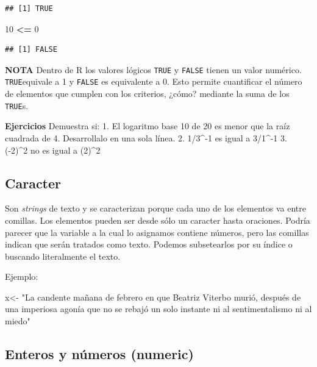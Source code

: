 \documentclass[
]{book}
\newenvironment{Shaded}{\begin{snugshade}}{\end{snugshade}}
\newcommand{\DecValTok}[1]{\textcolor[rgb]{0.00,0.00,0.81}{#1}}
\newcommand{\NormalTok}[1]{#1}
\newcommand{\OtherTok}[1]{\textcolor[rgb]{0.56,0.35,0.01}{#1}}
\newcommand{\SpecialCharTok}[1]{\textcolor[rgb]{0.81,0.36,0.00}{\textbf{#1}}}
\newcommand{\StringTok}[1]{\textcolor[rgb]{0.31,0.60,0.02}{#1}}
\begin{document}
\begin{verbatim}
## [1] TRUE
\end{verbatim}

\begin{Shaded}
\begin{Highlighting}[]
\DecValTok{10} \SpecialCharTok{\textless{}=} \DecValTok{0}   
\end{Highlighting}
\end{Shaded}

\begin{verbatim}
## [1] FALSE
\end{verbatim}

\textbf{NOTA} Dentro de R los valores lógicos \texttt{TRUE} y \texttt{FALSE} tienen un valor numérico. \texttt{TRUE}equivale a 1 y \texttt{FALSE} es equivalente a 0. Esto permite cuantificar el número de elementos que cumplen con los criterios, ¿cómo? mediante la suma de los \texttt{TRUE}s.

\textbf{Ejercicios}
Demuestra si:
1. El logaritmo base 10 de 20 es menor que la raíz cuadrada de 4. Desarrollalo en una sola línea.
2. 1/3\^{}-1 es igual a 3/1\^{}-1
3. (-2)\^{}2 no es igual a (2)\^{}2

\hypertarget{caracter}{%
\subsection{Caracter}\label{caracter}}

Son \emph{strings} de texto y se caracterizan porque cada uno de los elementos va entre comillas. Los elementos pueden ser desde sólo un caracter hasta oraciones.
Podría parecer que la variable a la cual lo asignamos contiene números, pero las comillas indican que serán tratados como texto. Podemos subsetearlos por su índice o buscando literalmente el texto.

Ejemplo:

\begin{Shaded}
\begin{Highlighting}[]
\NormalTok{x}\OtherTok{\textless{}{-}} \StringTok{"La candente mañana de febrero en que Beatriz Viterbo murió, después de una imperiosa agonía que no se rebajó un solo instante ni al sentimentalismo ni al miedo"}
\end{Highlighting}
\end{Shaded}

\hypertarget{enteros-y-nuxfameros-numeric}{%
\subsection{Enteros y números (numeric)}\label{enteros-y-nuxfameros-numeric}}
\end{document}
